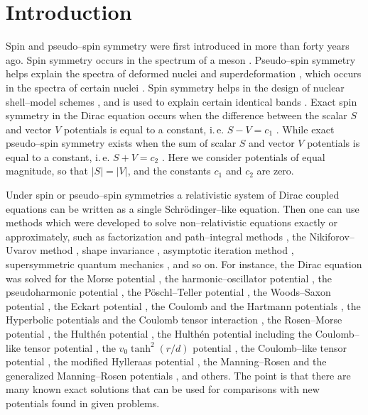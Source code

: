 \documentclass[amsmath,amssymb,superscriptaddress,showkeys, showpacs, aps, nofootinbib]{revtex4}
\begin{document}
\section{Introduction}
Spin and pseudo--spin symmetry were first introduced in \cite{SSV1, SSV2} more than forty years ago. Spin symmetry occurs in the spectrum of a meson \cite{Mes, Nu2, Nu3, Nu4}. Pseudo--spin symmetry helps explain the spectra of deformed nuclei \cite{Nuc1} and superdeformation \cite{Sup}, which occurs in the spectra of certain nuclei \cite{Nuc2}. Spin symmetry helps in the design of nuclear shell--model schemes \cite{NS1, NS2, NS3}, and is used to explain certain identical bands \cite{IB1, IB2, IB3}.  Exact spin symmetry in the Dirac equation occurs when the difference between the scalar $S$ and vector $V$ potentials is equal to a constant, i.\,e. $S-V=c_1$ \cite{Nu2}. While exact pseudo--spin symmetry exists when the sum of scalar $S$ and vector $V$ potentials is equal to a constant, i.\,e. $S+V=c_2$ \cite{S-V1, S-V2}. Here we consider potentials of equal magnitude, so that $|S|=|V|$, and the constants $c_1$ and $c_2$ are zero.

Under spin or pseudo--spin symmetries a relativistic system of Dirac coupled equations can be written as a single Schr\"{o}dinger--like equation. Then one can use methods which were developed to solve non--relativistic equations exactly or approximately, such as factorization and path--integral methods \cite{FPM1, FPM2, FPM3, FPM4, FPM5}, the Nikiforov--Uvarov method \cite{NU}, shape invariance \cite{SI1, SI2}, asymptotic iteration method \cite{AIM1, AIM2, AIM3, AIM4, AIM5}, supersymmetric quantum mechanics \cite{SU}, and so on. For instance, the Dirac equation was solved for the Morse potential \cite{Mor1, Mor2, Mor3, Mor4, Mor5}, the harmonic--oscillator potential \cite{Har1, Har2, Har3}, the pseudoharmonic potential \cite{PSH}, the P\"{o}schl--Teller potential \cite{PT1, PT2, PT3, PT4}, the Woods--Saxon potential \cite{WS1, WS2}, the Eckart potential \cite{Eck1, Eck2}, the Coulomb and the Hartmann potentials \cite{CH}, the Hyperbolic potentials and the Coulomb tensor interaction \cite{Hyp1, Hyp2}, the Rosen--Morse potential \cite{RM}, the Hulth\'en potential \cite{Hul1, Hul2, Hul3}, the Hulth\'en potential including the Coulomb--like tensor potential \cite{Hul0}, the $v_0\tanh^2(r/d)$ potential \cite{Pot}, the Coulomb--like tensor potential \cite{CT}, the modified Hylleraas potential \cite{Hyl}, the Manning--Rosen and the generalized Manning--Rosen potentials \cite{MR1, MR2, MR3, MR4, MR5}, and others.  The point is that there are many known exact solutions that can be used for comparisons with new potentials found in given problems. 
\end{document}
